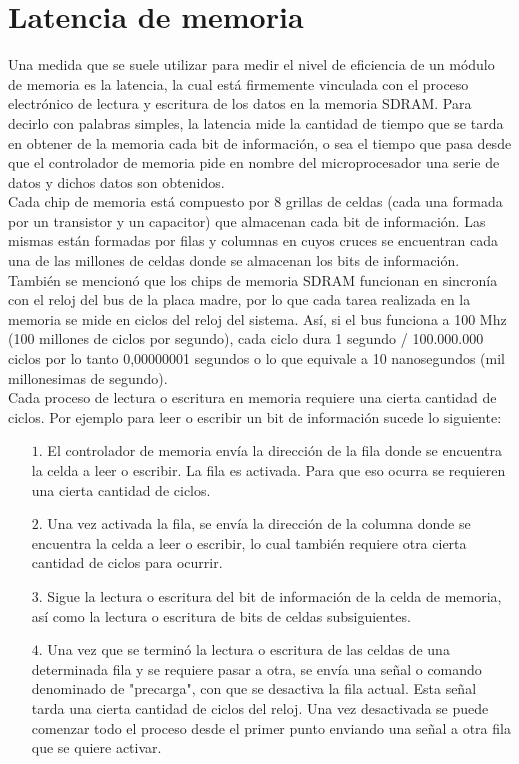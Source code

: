 \documentclass{article}
\begin{document}
\section*{Latencia de memoria}
Una medida que se suele utilizar para medir el nivel de eficiencia de un módulo de memoria es
la latencia, la cual está firmemente vinculada con el proceso electrónico de lectura y escritura
de los datos en la memoria SDRAM. Para decirlo con palabras simples, la latencia mide la
cantidad de tiempo que se tarda en obtener de la memoria cada bit de información, o sea el
tiempo que pasa desde que el controlador de memoria pide en nombre del microprocesador
una serie de datos y dichos datos son obtenidos.\\[0.1cm]
Cada chip de memoria está compuesto por 8 grillas de celdas (cada una formada por un
transistor y un capacitor) que almacenan cada bit de información. Las mismas están formadas
por filas y columnas en cuyos cruces se encuentran cada una de las millones de celdas donde se
almacenan los bits de información.\\[0.1cm]
También se mencionó que los chips de memoria SDRAM funcionan en sincronía con el reloj del
bus de la placa madre, por lo que cada tarea realizada en la memoria se mide en ciclos del reloj
del sistema. Así, si el bus funciona a 100 Mhz (100 millones de ciclos por segundo), cada ciclo
dura 1 segundo / 100.000.000 ciclos por lo tanto 0,00000001 segundos o lo que equivale a
10 nanosegundos (mil millonesimas de segundo).\\[0.1cm]
Cada proceso de lectura o escritura en memoria requiere una cierta cantidad de ciclos. Por
ejemplo para leer o escribir un bit de información sucede lo siguiente:
\begin{itemize}
\item[$1.$] El controlador de memoria envía la dirección de la fila donde se encuentra la celda a leer o
escribir. La fila es activada. Para que eso ocurra se requieren una cierta cantidad de ciclos.
\item [$2.$] Una vez activada la fila, se envía la dirección de la columna donde se encuentra la celda a
leer o escribir, lo cual también requiere otra cierta cantidad de ciclos para ocurrir.
\item [$3.$] Sigue la lectura o escritura del bit de información de la celda de memoria, así como la lectura o escritura de bits de celdas subsiguientes.
\item [$4.$] Una vez que se terminó la lectura o escritura de las celdas de una determinada fila y se
requiere pasar a otra, se envía una señal o comando denominado de "precarga", con que se
desactiva la fila actual. Esta señal tarda una cierta cantidad de ciclos del reloj. Una vez
desactivada se puede comenzar todo el proceso desde el primer punto enviando una señal
a otra fila que se quiere activar.
\end{itemize}
\end{document}
